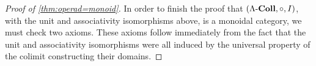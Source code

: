 \begin{proof}[Proof of \cref{thm:operad=monoid}]
In order to finish the proof that $(\Lambda\mbox{-}\mathbf{Coll}, \circ, I)$, with the unit and associativity isomorphisms above, is a monoidal category, we must check two axioms.
These axioms follow immediately from the fact that the unit and associativity isomorphisms were all induced by the universal property of the colimit constructing their domains.



\end{proof}
